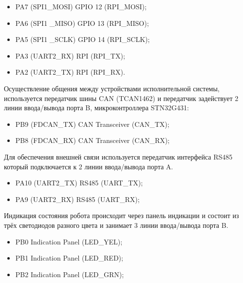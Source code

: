 \begin{itemize}
	\item PA7 (SPI1\_MOSI) \rightarrow GPIO 12 (RPI\_MOSI);
	\item PA6 (SPI1 \_MISO) \rightarrow GPIO 13 (RPI\_MISO);
	\item PA5 (SPI1 \_SCLK) \rightarrow GPIO 14 (RPI\_SCLK);
	\item PA3 (UART2\_RX) \rightarrow RPI (RPI\_TX);
	\item PA2 (UART2\_TX) \rightarrow RPI (RPI\_RX).
\end{itemize}

Осуществление общения между устройствами исполнительной системы, используется передатчик шины CAN (TCAN1462) и передатчик задействует 2 линии ввода/вывода порта B, микроконтроллера STN32G431:
\begin{itemize}
	\item PB9 (FDCAN\_TX) \rightarrow CAN Transceiver (CAN\_TX);
	\item PB8 (FDCAN\_RX) \rightarrow CAN Transceiver (CAN\_RX);
\end{itemize}

Для обеспечения внешней связи используется передатчик интерфейса RS485 который подключается к 2 линии ввода/вывода порта A.
\begin{itemize}
	\item PA10 (UART2\_TX) \rightarrow RS485 (UART\_TX);
	\item PA9 (UART2\_RX) \rightarrow RS485 (UART\_RX);
\end{itemize}

Индикация состояния робота происходит через панель индикации и состоит из трёх светодиодов разного цвета и занимает 3 линии ввода/вывода порта B.
\begin{itemize}
	\item PB0 \leftarrow Indication Panel (LED\_YEL);
	\item PB1 \leftarrow Indication Panel (LED\_RED);
	\item PB2 \leftarrow Indication Panel (LED\_GRN);
\end{itemize}

